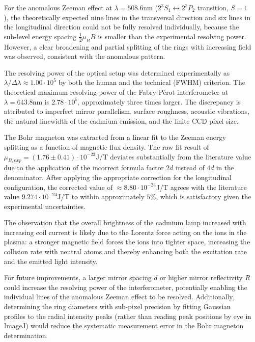 \documentclass{article}
\begin{document}
For the anomalous Zeeman effect at $\lambda = 508.6$nm ($2^3S_1 \leftrightarrow 2^3P_2$ transition, $S=1$), the theoretically expected nine lines in the transversal direction and six lines in the longitudinal direction could not be fully resolved individually, because the sub-level energy spacing $\frac{1}{2}\mu_B B$ is smaller than the experimental resolving power. However, a clear broadening and partial splitting of the rings with increasing field was observed, consistent with the anomalous pattern.

The resolving power of the optical setup was determined experimentally as $\lambda/\Delta\lambda \approx 1.00 \cdot 10^5$ by both the human and the technical (FWHM) criterion. The theoretical maximum resolving power of the Fabry-Pérot interferometer at $\lambda = 643.8$nm is $2.78 \cdot 10^5$, approximately three times larger. The discrepancy is attributed to imperfect mirror parallelism, surface roughness, acoustic vibrations, the natural linewidth of the cadmium emission, and the finite CCD pixel size.

The Bohr magneton was extracted from a linear fit to the Zeeman energy splitting as a function of magnetic flux density. The raw fit result of $\mu_{B,exp} = (1.76 \pm 0.41) \cdot 10^{-23}$J/T deviates substantially from the literature value due to the application of the incorrect formula factor $2d$ instead of $4d$ in the denominator. After applying the appropriate correction for the longitudinal configuration, the corrected value of $\approx 8.80 \cdot 10^{-24}$J/T agrees with the literature value $9.274 \cdot 10^{-24}$J/T to within approximately $5\%$, which is satisfactory given the experimental uncertainties.

The observation that the overall brightness of the cadmium lamp increased with increasing coil current is likely due to the Lorentz force acting on the ions in the plasma: a stronger magnetic field forces the ions into tighter space, increasing the collision rate with neutral atoms and thereby enhancing both the excitation rate and the emitted light intensity.

For future improvements, a larger mirror spacing $d$ or higher mirror reflectivity $R$ could increase the resolving power of the interferometer, potentially enabling the individual lines of the anomalous Zeeman effect to be resolved. Additionally, determining the ring diameters with sub-pixel precision by fitting Gaussian profiles to the radial intensity peaks (rather than reading peak positions by eye in ImageJ) would reduce the systematic measurement error in the Bohr magneton determination.

\newpage
\listoffigures
\listoftables
\printbibliography %
\end{document}
